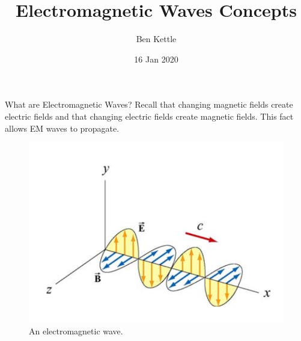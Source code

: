 \documentclass{beamer}
\title{Electromagnetic Waves Concepts}
\author{Ben Kettle}
\date{16 Jan 2020}
\begin{document}
 
\frame{\titlepage}

\begin{frame}{What are Electromagnetic Waves?}
    Recall that changing magnetic fields create electric fields and that changing electric fields create magnetic fields. This fact allows EM waves to propagate. 
    
    \begin{figure}
        \centering
        \includegraphics[scale=.4]{emwave.png}
        \caption{An electromagnetic wave.}
        \label{fig:emwave}
    \end{figure}
\end{frame}
\end{document}
